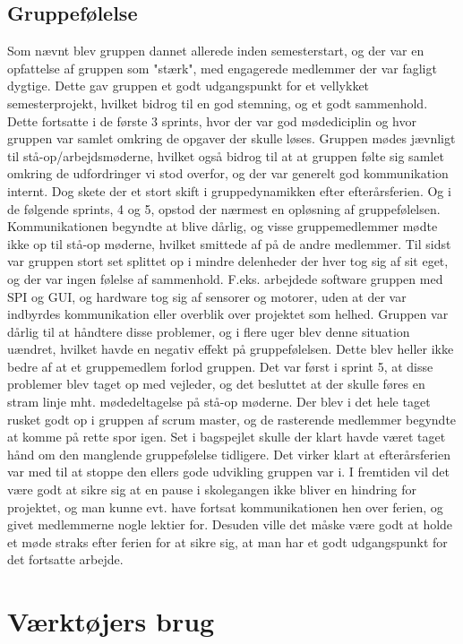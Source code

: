 \subsection{Gruppefølelse}
Som nævnt blev gruppen dannet allerede inden semesterstart, og der var en opfattelse af gruppen som "stærk", med engagerede medlemmer der var fagligt dygtige.
Dette gav gruppen et godt udgangspunkt for et vellykket semesterprojekt, hvilket bidrog til en god stemning, og et godt sammenhold. Dette fortsatte i de første
3 sprints, hvor der var god mødediciplin og hvor gruppen var samlet omkring de opgaver der skulle løses. Gruppen mødes jævnligt til stå-op/arbejdsmøderne,
hvilket også bidrog til at at gruppen følte sig samlet omkring de udfordringer vi stod overfor, og der var generelt god kommunikation internt. Dog skete der et 
stort skift i gruppedynamikken efter efterårsferien. Og i de følgende sprints, 4 og 5, opstod der nærmest en opløsning af gruppefølelsen. Kommunikationen begyndte 
at blive dårlig, og visse gruppemedlemmer mødte ikke op til stå-op møderne, hvilket smittede af på de andre medlemmer. Til sidst var gruppen stort set splittet
op i mindre delenheder der hver tog sig af sit eget, og der var ingen følelse af sammenhold. F.eks. arbejdede software gruppen med SPI og GUI, og hardware 
tog sig af sensorer og motorer, uden at der var indbyrdes kommunikation eller overblik over projektet som helhed. Gruppen var dårlig til at håndtere disse 
problemer, og i flere uger blev denne situation uændret, hvilket havde en negativ effekt på gruppefølelsen. Dette blev heller ikke bedre af at et gruppemedlem 
forlod gruppen. Det var først i sprint 5, at disse problemer blev taget op med vejleder, og det besluttet at der skulle føres en stram linje mht. mødedeltagelse
på stå-op møderne. Der blev i det hele taget rusket godt op i gruppen af scrum master, og de rasterende medlemmer begyndte at komme på rette spor igen. Set i bagspejlet
skulle der klart havde været taget hånd om den manglende gruppefølelse tidligere. Det virker klart at efterårsferien var med til at stoppe den ellers
gode udvikling gruppen var i. I fremtiden vil det være godt at sikre sig at en pause i skolegangen ikke bliver en hindring for projektet, og man kunne evt. 
have fortsat kommunikationen hen over ferien, og givet medlemmerne nogle lektier for. Desuden ville det måske være godt at holde et møde straks efter ferien
for at sikre sig, at man har et godt udgangspunkt for det fortsatte arbejde.  

\section{Værktøjers brug}
